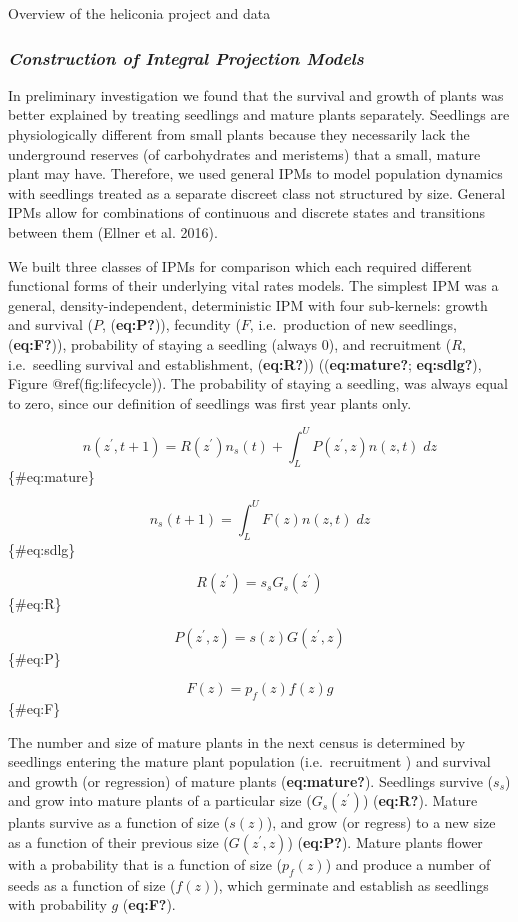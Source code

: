 \documentclass[
]{article}
\begin{document}
Overview of the heliconia project and data

\hypertarget{construction-of-integral-projection-models}{%
\subsubsection{\texorpdfstring{\emph{Construction of Integral Projection
Models}}{Construction of Integral Projection Models}}\label{construction-of-integral-projection-models}}

In preliminary investigation we found that the survival and growth of
plants was better explained by treating seedlings and mature plants
separately. Seedlings are physiologically different from small plants
because they necessarily lack the underground reserves (of carbohydrates
and meristems) that a small, mature plant may have. Therefore, we used
general IPMs to model population dynamics with seedlings treated as a
separate discreet class not structured by size. General IPMs allow for
combinations of continuous and discrete states and transitions between
them (Ellner et al. 2016).

We built three classes of IPMs for comparison which each required
different functional forms of their underlying vital rates models. The
simplest IPM was a general, density-independent, deterministic IPM with
four sub-kernels: growth and survival (\(P\), (\textbf{eq:P?})),
fecundity (\(F\), i.e.~production of new seedlings, (\textbf{eq:F?})),
probability of staying a seedling (always 0), and recruitment (\(R\),
i.e.~seedling survival and establishment, (\textbf{eq:R?}))
((\textbf{eq:mature?}; \textbf{eq:sdlg?}), Figure @ref(fig:lifecycle)).
The probability of staying a seedling, was always equal to zero, since
our definition of seedlings was first year plants only.

\[
n(z^{\prime},t+1) = R(z^\prime)n_s(t) + \int_L^U P(z^\prime,z) n(z,t)\;dz
\]\{\#eq:mature\}

\[
n_s(t+1) = \int_L^U F(z) n(z,t) \; dz
\]\{\#eq:sdlg\}

\[
R(z^\prime) = s_sG_s(z^\prime)
\]\{\#eq:R\}

\[
P(z^\prime, z) = s(z)G(z^\prime, z)
\]\{\#eq:P\}

\[
F(z) = p_f(z)f(z)g
\]\{\#eq:F\}

The number and size of mature plants in the next census is determined by
seedlings entering the mature plant population (i.e.~recruitment ) and
survival and growth (or regression) of mature plants
(\textbf{eq:mature?}). Seedlings survive (\(s_s\)) and grow into mature
plants of a particular size (\(G_s(z^\prime)\)) (\textbf{eq:R?}). Mature
plants survive as a function of size (\(s(z)\)), and grow (or regress)
to a new size as a function of their previous size (\(G(z^\prime, z)\))
(\textbf{eq:P?}). Mature plants flower with a probability that is a
function of size (\(p_f(z)\)) and produce a number of seeds as a
function of size (\(f(z)\)), which germinate and establish as seedlings
with probability \(g\) (\textbf{eq:F?}).
\end{document}
